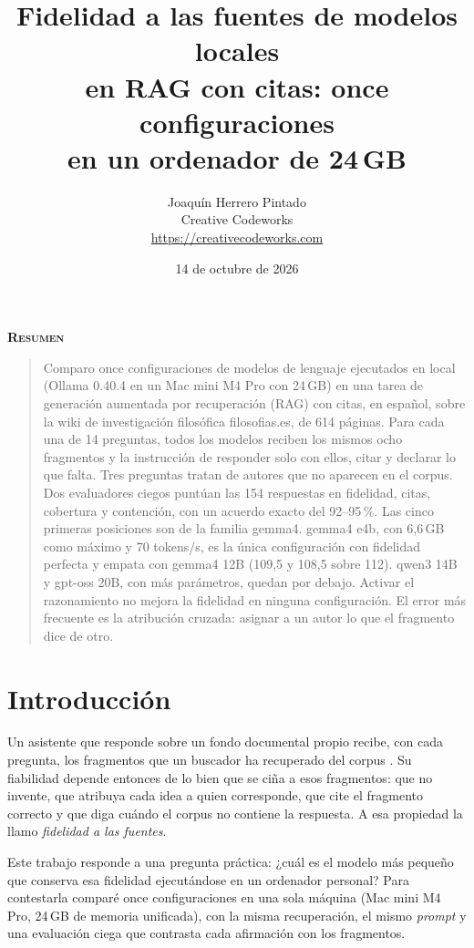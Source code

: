 \documentclass{article}
\title{Fidelidad a las fuentes de modelos locales\\
en RAG con citas: once configuraciones\\
en un ordenador de 24\,GB}
\author{
  Joaquín Herrero Pintado\\
  Creative Codeworks\\
  \url{https://creativecodeworks.com}\\
}
\date{14 de octubre de 2026}
\renewenvironment{abstract}
{\centerline{\large \bfseries \scshape Resumen}\begin{quote}}
{\end{quote}}
\begin{document}
\maketitle

\begin{abstract}
Comparo once configuraciones de modelos de lenguaje ejecutados en local
(Ollama 0.40.4 en un Mac mini M4 Pro con 24\,GB) en una tarea de generación
aumentada por recuperación (RAG) con citas, en español, sobre
la wiki de investigación filosófica filosofias.es, de 614 páginas. Para cada
una de 14 preguntas, todos los modelos reciben los mismos ocho fragmentos y
la instrucción de responder solo con ellos, citar y declarar lo que falta.
Tres preguntas tratan de autores que no aparecen en el corpus. Dos
evaluadores ciegos puntúan las 154 respuestas en fidelidad, citas,
cobertura y contención, con un acuerdo exacto del 92--95\,\%. Las cinco
primeras posiciones son de la familia gemma4. gemma4 e4b, con 6,6\,GB como
máximo y 70 tokens/s, es la única configuración con fidelidad perfecta y
empata con gemma4 12B (109,5 y 108,5 sobre 112). qwen3 14B y gpt-oss 20B,
con más parámetros, quedan por debajo. Activar el razonamiento no mejora la
fidelidad en ninguna configuración. El error más frecuente es la atribución
cruzada: asignar a un autor lo que el fragmento dice de otro.
\end{abstract}


\section{Introducción}

Un asistente que responde sobre un fondo documental propio recibe, con cada
pregunta, los fragmentos que un buscador ha recuperado del corpus
\citep{lewis2020rag}. Su fiabilidad depende entonces de lo bien que se ciña
a esos fragmentos: que no invente, que atribuya cada idea a quien
corresponde, que cite el fragmento correcto y que diga cuándo el corpus no
contiene la respuesta. A esa propiedad la llamo \emph{fidelidad a las
fuentes}.

Este trabajo responde a una pregunta práctica: ¿cuál es el modelo más
pequeño que conserva esa fidelidad ejecutándose en un ordenador personal?
Para contestarla comparé once configuraciones en una sola máquina (Mac mini
M4 Pro, 24\,GB de memoria unificada), con la misma recuperación, el mismo
\emph{prompt} y una evaluación ciega que contrasta cada afirmación con los
fragmentos.
\end{document}
